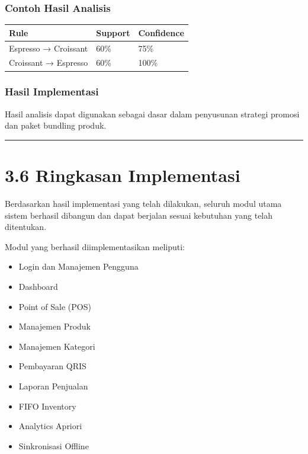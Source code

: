 \subsubsection{Contoh Hasil Analisis}\label{contoh-hasil-analisis}

{\def\LTcaptype{none} %
\begin{longtable}[]{@{}lll@{}}
\toprule\noalign{}
Rule & Support & Confidence \\
\midrule\noalign{}
\endhead
\bottomrule\noalign{}
\endlastfoot
Espresso → Croissant & 60\% & 75\% \\
Croissant → Espresso & 60\% & 100\% \\
\end{longtable}
}

\subsubsection{Hasil Implementasi}\label{hasil-implementasi-9}

Hasil analisis dapat digunakan sebagai dasar dalam penyusunan strategi promosi dan paket bundling produk.

\begin{center}\rule{0.5\linewidth}{0.5pt}\end{center}

\section{3.6 Ringkasan Implementasi}\label{ringkasan-implementasi}

Berdasarkan hasil implementasi yang telah dilakukan, seluruh modul utama sistem berhasil dibangun dan dapat berjalan sesuai kebutuhan yang telah ditentukan.

Modul yang berhasil diimplementasikan meliputi:

\begin{itemize}
\tightlist
\item
  Login dan Manajemen Pengguna
\item
  Dashboard
\item
  Point of Sale (POS)
\item
  Manajemen Produk
\item
  Manajemen Kategori
\item
  Pembayaran QRIS
\item
  Laporan Penjualan
\item
  FIFO Inventory
\item
  Analytics Apriori
\item
  Sinkronisasi Offline
\end{itemize}

